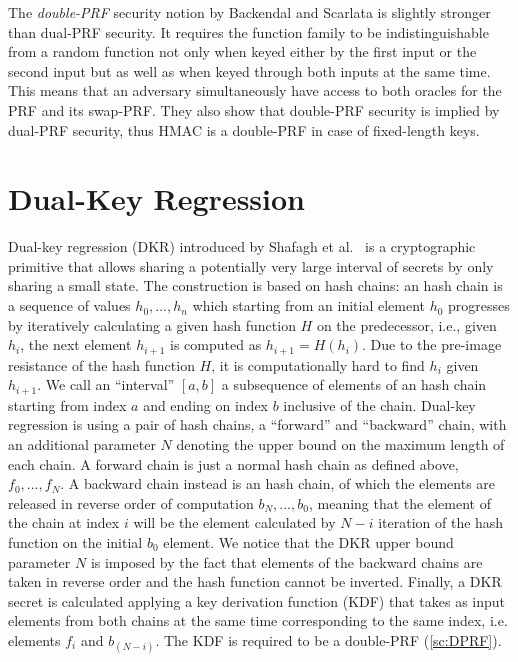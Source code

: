 The \textit{double-PRF} security notion by Backendal and Scarlata 
is slightly stronger than dual-PRF security.
It requires the function family to be indistinguishable from a random 
function not only when keyed either by the first input or the second input
but as well as when keyed through both inputs at the same time.
This means that an adversary simultaneously have access to both 
oracles for the PRF and its swap-PRF.
They also show that double-PRF security is implied by dual-PRF security,
thus HMAC is a double-PRF in case of fixed-length keys.

\section{Dual-Key Regression}\label{sc:DKR}

Dual-key regression (DKR) introduced by Shafagh et al.~\cite{USENIX:SBRH20} is a
cryptographic primitive that allows sharing a potentially very large interval 
of secrets by only sharing a small state.
The construction is based on hash chains: an hash chain is a sequence of values
$h_{0}, ..., h_{n}$ which starting from an initial
element $h_0$ progresses by iteratively calculating
a given hash function $H$ on the predecessor,
i.e., given $h_i$, the next element $h_{i+1}$ is computed as $h_{i+1} = H(h_i)$.
Due to the pre-image resistance of the hash function $H$, 
it is computationally hard to find $h_i$ given $h_{i+1}$.
We call an ``interval'' $[a, b]$ a subsequence of elements
of an hash chain starting from index $a$ and ending
on index $b$ inclusive of the chain.  
Dual-key regression is using a pair of hash chains,
a ``forward'' and ``backward'' chain, with an additional
parameter $N$ denoting the
upper bound on the maximum length of each chain.
A forward chain is just a normal hash chain as defined
above, $f_{0}, ..., f_{N}$.
A backward chain instead is an hash chain, of which the
elements are released in reverse order of computation
$b_{N}, ..., b_{0}$, meaning that the element of the chain 
at index $i$ will be the element calculated by $N - i$
iteration of the hash function on the initial $b_{0}$
element. We notice that the DKR upper bound parameter
$N$ is imposed by the
fact that elements of the backward chains are taken in
reverse order and the hash function cannot be inverted.
Finally, a DKR secret is calculated applying
a key derivation function (KDF) that takes
as input elements from both chains at the same
time corresponding to the same index, i.e.\!
elements $f_{i}$ and $b_{(N - i)}$.
The KDF is required to be a double-PRF (\cref{sc:DPRF}).

